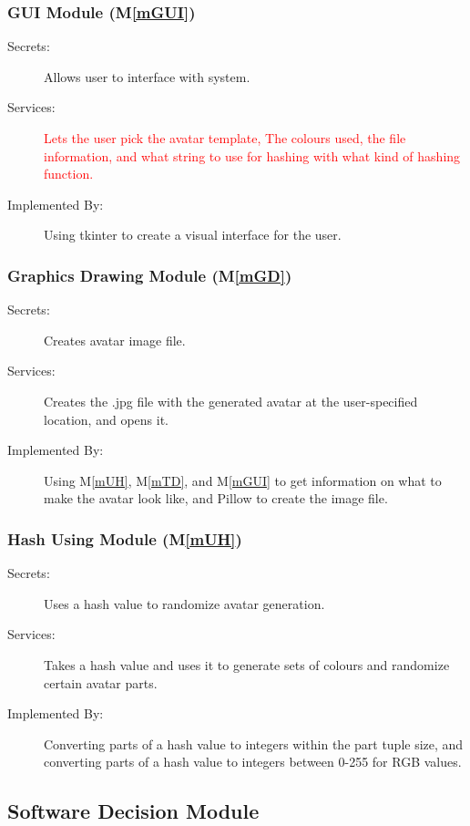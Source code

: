 \documentclass[12pt, titlepage]{article}
\newcommand{\mref}[1]{M\ref{#1}}
\begin{document}
\subsubsection{GUI Module (\mref{mGUI})}

\begin{description}
\item[Secrets:]Allows user to interface with system.
\item[Services:]\textcolor{red}{ Lets the user pick the avatar template, The colours used, the file information, and what string to use for hashing with what kind of hashing function.}
\item[Implemented By:] Using tkinter to create a visual interface for the user.
\end{description}

\subsubsection{Graphics Drawing Module (\mref{mGD})}

\begin{description}
\item[Secrets:] Creates avatar image file.
\item[Services:] Creates the .jpg file with the generated avatar at the user-specified location, and opens it.
\item[Implemented By:] Using \mref{mUH}, \mref{mTD}, and \mref{mGUI} to get information on what to make the avatar look like, and Pillow to create the image file.
\end{description}

\subsubsection{Hash Using Module (\mref{mUH})}

\begin{description}
\item[Secrets:]Uses a hash value to randomize avatar generation.
\item[Services:]Takes a hash value and uses it to generate sets of colours and randomize certain avatar parts.
\item[Implemented By:] Converting parts of a hash value to integers within the part tuple size, and converting parts of a hash value to integers between 0-255 for RGB values.
\end{description}

\subsection{Software Decision Module}
\end{document}

